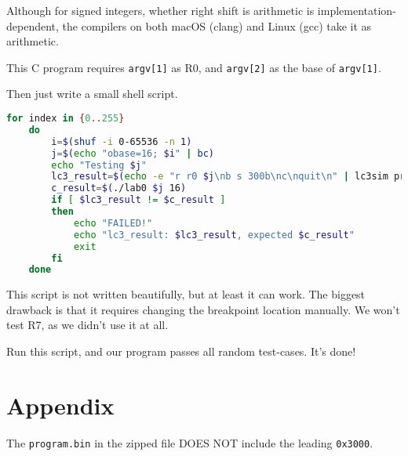 \documentclass{article}
\begin{document}
	Although for signed integers, whether right shift is arithmetic is implementation-dependent, the compilers on both macOS (clang) and Linux (gcc) take it as arithmetic.
	
	This C program requires \texttt{argv[1]} as R0, and \texttt{argv[2]} as the base of \texttt{argv[1]}.
	
	Then just write a small shell script.
	
	\begin{lstlisting}[language=bash, caption={The testing script},captionpos=b]
	for index in {0..255}
	do
		i=$(shuf -i 0-65536 -n 1)
		j=$(echo "obase=16; $i" | bc)
		echo "Testing $j"
		lc3_result=$(echo -e "r r0 $j\nb s 300b\nc\nquit\n" | lc3sim program.bin | tail -3 | head -1 | cut -c 4-8)
		c_result=$(./lab0 $j 16)
		if [ $lc3_result != $c_result ]
		then
			echo "FAILED!"
			echo "lc3_result: $lc3_result, expected $c_result"
			exit
		fi
	done
	\end{lstlisting}
	
	This script is not written beautifully, but at least it can work. The biggest drawback is that it requires changing the breakpoint location manually. We won't test R7, as we didn't use it at all.
	
	Run this script, and our program passes all random test-cases. It's done!
	
	\section{Appendix}
	The \texttt{program.bin} in the zipped file DOES NOT include the leading \texttt{0x3000}.
	
	
\end{document}
